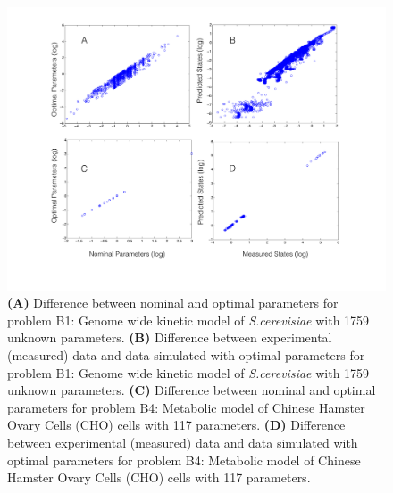 \documentclass[12pt]{article}
\begin{document}
\begin{figure}[ht]
\centering
\includegraphics[width=1.00\textwidth]{./figs/Figure_B1_B4_params_measuredstates}
\caption{ \textbf {(A)} Difference between nominal and optimal parameters for problem B1: Genome wide kinetic model of \textit{S.cerevisiae} with 1759 unknown parameters. \textbf {(B)} Difference between experimental (measured) data and data simulated with optimal parameters for problem B1: Genome wide kinetic model of \textit{S.cerevisiae} with 1759 unknown parameters. \textbf {(C)} Difference between nominal and optimal parameters for problem B4: Metabolic model of Chinese  Hamster Ovary Cells (CHO) cells with 117 parameters. \textbf {(D)} Difference between experimental (measured) data and data simulated with optimal parameters for problem B4: Metabolic model of Chinese  Hamster Ovary Cells (CHO) cells with 117 parameters.
}\label{fig-benchmark}
\end{figure}
\end{document}
